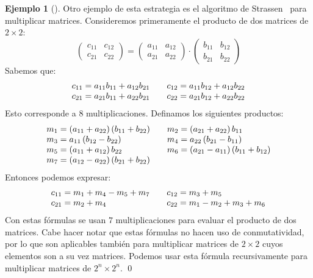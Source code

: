 \documentclass[english, spanish, fleqn, 10pt]{article}
\numberwithin{equation}{section}
\theoremstyle{definition}
\newtheorem{beforeExample}{Ejemplo}[section]
\newenvironment{ejemplo}[1][]{\begin{beforeExample}[#1]\renewcommand{\qedsymbol}{$\blacksquare$}}{\qed\end{beforeExample}}
\begin{document}
\begin{ejemplo}
  Otro ejemplo de esta estrategia es el algoritmo de Strassen~%
  \cite{strassen69:_matrix_multiplication}
  para multiplicar matrices.
  Consideremos primeramente el producto de
  dos matrices de \(2 \times 2\):
  \begin{equation*}
    \begin{pmatrix}
      c_{1 1} & c_{1 2} \\
      c_{2 1} & c_{2 2}
    \end{pmatrix}
    = \begin{pmatrix}
      a_{1 1} & a_{1 2} \\
      a_{2 1} & a_{2 2}
    \end{pmatrix}
    \cdot
    \begin{pmatrix}
      b_{1 1} & b_{1 2} \\
      b_{2 1} & b_{2 2}
    \end{pmatrix}
  \end{equation*}
  Sabemos que:
  \begin{equation*}
    \begin{array}{l@{\qquad}l}
      c_{1 1}
        = a_{1 1} b_{1 1} + a_{1 2} b_{2 1} &
      c_{1 2}
        = a_{1 1} b_{1 2} + a_{1 2} b_{2 2} \\
      c_{2 1}
        = a_{2 1} b_{1 1} + a_{2 2} b_{2 1} &
      c_{2 2}
        = a_{2 1} b_{1 2} + a_{2 2} b_{2 2}
    \end{array}
  \end{equation*}
  Esto corresponde a \(8\) multiplicaciones.
  Definamos los siguientes productos:
  \begin{equation*}
    \begin{array}{l@{\qquad}l}
      m_1
        = (a_{1 1} + a_{2 2}) \, (b_{1 1} + b_{2 2}) &
      m_2
        = (a_{2 1} + a_{2 2}) \, b_{1 1} \\
      m_3
        = a_{1 1} \, (b_{1 2} - b_{2 2}) &
      m_4
        = a_{2 2} \, (b_{2 1} - b_{1 1}) \\
      m_5
        = (a_{1 1} + a_{1 2}) \, b_{2 2} &
      m_6
        = (a_{2 1} - a_{1 1}) \, (b_{1 1} + b_{1 2}) \\
      m_7
        = (a_{1 2} - a_{2 2}) \, (b_{2 1} + b_{2 2})
    \end{array}
  \end{equation*}
  Entonces podemos expresar:
  \begin{align*}
    \begin{array}{l@{\qquad}l}
      c_{1 1}
        = m_1 + m_4 - m_5 + m_7 &
      c_{1 2}
        = m_3 + m_5 \\
      c_{2 1}
        = m_2 + m_4 &
      c_{2 2}
        = m_1 - m_2 + m_3 + m_6
    \end{array}
  \end{align*}
  Con estas fórmulas se usan \(7\) multiplicaciones
  para evaluar el producto de dos matrices.
  Cabe hacer notar que estas fórmulas no hacen uso de conmutatividad,
  por lo que son aplicables también
  para multiplicar matrices de \(2 \times 2\)
  cuyos elementos son a su vez matrices.
  Podemos usar esta fórmula recursivamente
  para multiplicar matrices de \(2^n \times 2^n\).
\end{ejemplo}
\end{document}
